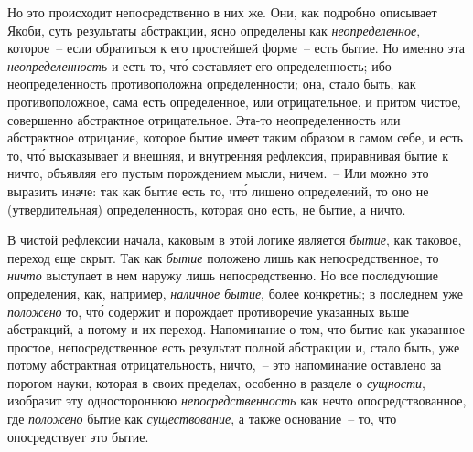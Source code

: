 Но это происходит непосредственно в них же. Они,
как подробно описывает Якоби, суть результаты абстракции,
ясно определены как \emph{неопределенное}, которое~-- если
обратиться к его простейшей форме~-- есть бытие. Но
именно эта \emph{неопределенность} и есть то, чт\'о составляет
его определенность; ибо неопределенность противоположна
определенности; она, стало быть, как противоположное,
сама есть определенное, или отрицательное, и
притом чистое, совершенно абстрактное отрицательное.
Эта-то неопределенность или абстрактное отрицание, которое
бытие имеет таким образом в самом себе, и есть то,
чт\'о высказывает и внешняя, и внутренняя рефлексия,
приравнивая бытие к ничто, объявляя его пустым порождением
мысли, ничем.~-- Или можно это выразить
иначе: так как бытие есть то, чт\'о лишено определений, то
оно не (утвердительная) определенность, которая оно
есть, не бытие, а ничто.

В чистой рефлексии начала, каковым в этой логике
является \emph{бытие}, как таковое, переход еще скрыт. Так как
\emph{бытие} положено лишь как непосредственное, то \emph{ничто}
выступает в нем наружу лишь непосредственно. Но все
последующие определения, как, например, \emph{наличное бытие},
более конкретны; в последнем уже \emph{положено} то, чт\'о
содержит и порождает противоречие указанных выше
абстракций, а потому и их переход. Напоминание о том,
что бытие как указанное простое, непосредственное есть
результат полной абстракции и, стало быть, уже потому
абстрактная отрицательность, ничто,~-- это напоминание
оставлено за порогом науки, которая в своих пределах,
особенно в разделе о \emph{сущности}, изобразит эту одностороннюю
\emph{непосредственность} как нечто опосредствованное,
где \emph{положено} бытие как \emph{существование}, а также основание~--
то, что опосредствует это бытие.

